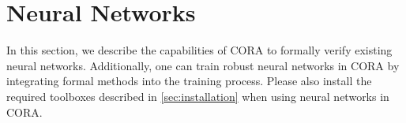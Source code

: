 \section{Neural Networks} \label{sec:neuralNetworks}

In this section, we describe the capabilities of CORA to formally verify existing neural networks.
Additionally, one can train robust neural networks in CORA by integrating formal methods into the training process.
Please also install the required toolboxes described in \cref{sec:installation} when using neural networks in CORA.








